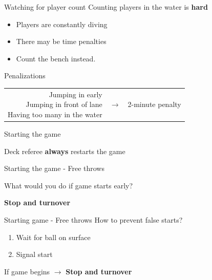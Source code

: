 \documentclass{beamer}
\begin{document}
    \begin{frame}{Watching for player count}
        Counting players in the water is \textbf{hard}
        \begin{itemize}
            \item Players are constantly diving
            \item There may be time penalties

            \pause

            \item Count the bench instead.
        \end{itemize}
    \end{frame}

    \begin{frame}{Penalizations}
        \begin{tabular}{rcl}
            \parbox{0.45\textwidth}
            {
                Jumping in early \\
                Jumping in front of lane \\
                Having too many in the water
            }
            &
            $\rightarrow$
            &
            2-minute penalty
        \end{tabular}
    \end{frame}

    \begin{frame}{Starting the game}
        \begin{center}
            Deck referee \textbf{always} restarts the game
        \end{center}
    \end{frame}

    \begin{frame}{Starting the game - Free throws}
        \begin{center}
            What would you do if game starts early? \pause

            \textbf{Stop and turnover}
        \end{center}
    \end{frame}

    \begin{frame}{Starting game - Free throws}
        How to prevent false starts?
        \begin{enumerate}
            \item Wait for ball on surface
            \item Signal start
        \end{enumerate}

        \pause

        If game begins $\rightarrow$ \textbf{Stop and turnover}
    \end{frame}
\end{document}

